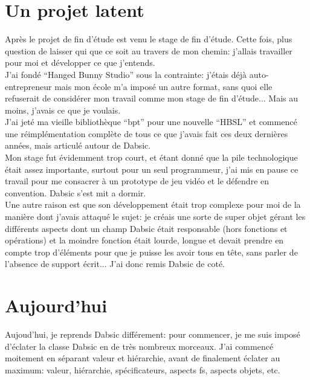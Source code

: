 \documentclass[a5paper, 12pt]{book}
\begin{document}
\newpage

\section{Un projet latent}

Après le projet de fin d'étude est venu le stage de fin d'étude.
Cette fois, plus question de laisser qui que ce soit au travers
de mon chemin: j'allais travailler pour moi et développer
ce que j'entends.\\

J'ai fondé ``Hanged Bunny Studio'' sous la contrainte: j'étais
déjà auto-entrepreneur mais mon école m'a imposé un autre format,
sans quoi elle refuserait de considérer mon travail comme
mon stage de fin d'étude... Mais au moins, j'avais ce que je voulais.\\

J'ai jeté ma vieille bibliothèque ``bpt'' pour une nouvelle ``HBSL''
et commencé une réimplémentation complète de tous ce que j'avais
fait ces deux dernières années, mais articulé autour de Dabsic.\\

Mon stage fut évidemment trop court, et étant donné que la pile
technologique était assez importante, surtout pour un seul programmeur,
j'ai mis en pause ce travail pour me consacrer à un prototype de jeu
vidéo et le défendre en convention. Dabsic s'est mit a dormir.\\

Une autre raison est que son développement était trop complexe
pour moi de la manière dont j'avais attaqué le sujet: je créais
une sorte de super objet gérant les différents aspects dont
un champ Dabsic était responsable (hors fonctions et opérations)
et la moindre fonction était lourde, longue et devait prendre en
compte trop d'éléments pour que je puisse les avoir tous en tête,
sans parler de l'absence de support écrit... J'ai donc remis Dabsic
de coté.\\

\newpage

\section{Aujourd'hui}

Aujoud'hui, je reprends Dabsic différement: pour commencer,
je me suis imposé d'éclater la classe Dabsic en de très nombreux
morceaux. J'ai commencé moitement en séparant valeur et
hiérarchie, avant de finalement éclater au maximum: valeur,
hiérarchie, spécificateurs, aspects fs, aspects objets, etc.\\
\end{document}
